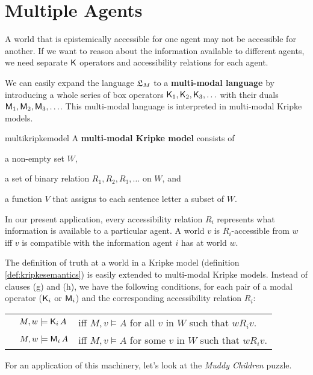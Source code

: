 \section{Multiple Agents}
\label{sec:multi}

A world that is epistemically accessible for one agent may not be accessible for
another. If we want to reason about the information available to different
agents, we need separate $\operatorname{\mathsf{K}{}}$ operators and accessibility relations for each
agent.

We can easily expand the language $\mathfrak{L}_M$ to a \textbf{multi-modal language} by
introducing a whole series of box operators $\operatorname{\mathsf{K}{}}_1, \operatorname{\mathsf{K}{}}_2, \operatorname{\mathsf{K}{}}_3, \ldots$ with
their duals $\operatorname{\mathsf{M}}_1, \operatorname{\mathsf{M}}_2, \operatorname{\mathsf{M}}_3, \ldots$. This multi-modal language is
interpreted in multi-modal Kripke models.

\begin{definition}{}{multikripkemodel}
  A \textbf{multi-modal Kripke model} consists of
  \vspace{-3mm}
  \begin{itemize*}
  \item a non-empty set $W$,
  \item a set of binary relation $R_1,R_2,R_{3},\ldots$ on $W$, and
  \item a function $V$ that assigns to each sentence letter a subset of $W$.
  \end{itemize*}
\end{definition}
%
In our present application, every accessibility relation $R_i$ represents what
information is available to a particular agent. A world $v$ is $R_i$-accessible
from $w$ iff $v$ is compatible with the information agent $i$ has at world $w$.

The definition of truth at a world in a Kripke model (definition
\ref{def:kripkesemantics}) is easily extended to multi-modal Kripke models.
Instead of clauses (g) and (h), we have the following conditions, for each pair
of a modal operator ($\operatorname{\mathsf{K}{}}_i$ or $\operatorname{\mathsf{M}}_i$) and the corresponding accessibility
relation $R_i$:

\bigskip
\begin{tabular}{lll}
  & $M,w \models \Kn_i A$ &iff $M,v \models A$ for all $v$ in $W$ such that $wR_iv$.\\
  & $M,w \models \Mi_i A$ &iff $M,v \models A$ for some $v$ in $W$ such that $wR_iv$.
\end{tabular}
\bigskip

For an application of this machinery, let's look at the \emph{Muddy Children}
puzzle.

